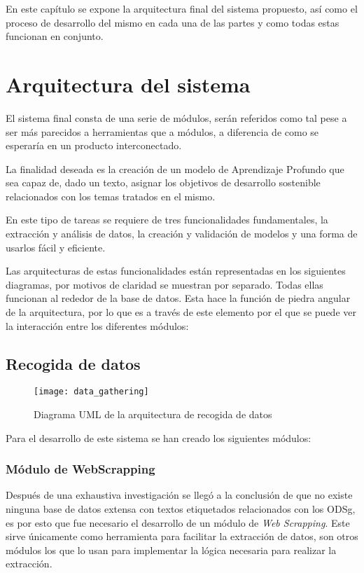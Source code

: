 En este capítulo se expone la arquitectura final del sistema propuesto, así como
el proceso de desarrollo del mismo en cada una de las partes y como todas estas
funcionan en conjunto. 

\section{Arquitectura del sistema} El sistema final consta de una
serie de módulos, serán referidos como tal pese a ser más parecidos a
herramientas que a módulos, a diferencia de como se esperaría en un producto
interconectado.

La finalidad deseada es la creación de un modelo de Aprendizaje Profundo que sea
capaz de, dado un texto, asignar los objetivos de desarrollo sostenible
relacionados con los temas tratados en el mismo. 

En este tipo de tareas se requiere de tres funcionalidades fundamentales, la
extracción y análisis de datos, la creación y validación de modelos y una forma
de usarlos fácil y eficiente.

Las arquitecturas de estas funcionalidades están representadas en los siguientes
diagramas, por motivos de claridad se muestran por separado. Todas ellas
funcionan al rededor de la base de datos. Esta hace la función de piedra angular
de la arquitectura, por lo que es a través de este elemento por el que se puede
ver la interacción entre los diferentes módulos:

\subsection{Recogida de datos}
\begin{figure}[H]
    \centering
    \texttt{[image: data\_gathering]}
    \captionsetup{justification=centering}
    \caption{Diagrama UML de la arquitectura de recogida de datos}
    \label{fig: Diagrama UML de la arquitectura de recogida de datos}
\end{figure}

Para el desarrollo de este sistema se han creado los siguientes módulos:

\subsubsection{Módulo de WebScrapping} Después de una exhaustiva investigación se llegó a la
conclusión de que no existe ninguna base de datos extensa con textos etiquetados
relacionados con los \gls{ODSg}, es por esto que fue
necesario el desarrollo de un módulo de \textit{Web Scrapping}. Este sirve únicamente como
herramienta para facilitar la extracción de datos, son otros módulos los que lo
usan para implementar la lógica necesaria para realizar la extracción.

